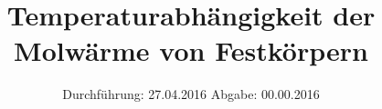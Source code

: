 


\subject{Versuchsprotokoll}
\title{Temperaturabhängigkeit der Molwärme von Festkörpern}
\date{
  Durchführung: 27.04.2016
  \hspace{3em}
  Abgabe: 00.00.2016
}




\maketitle
\thispagestyle{empty}

%
%
%

%

\printbibliography


